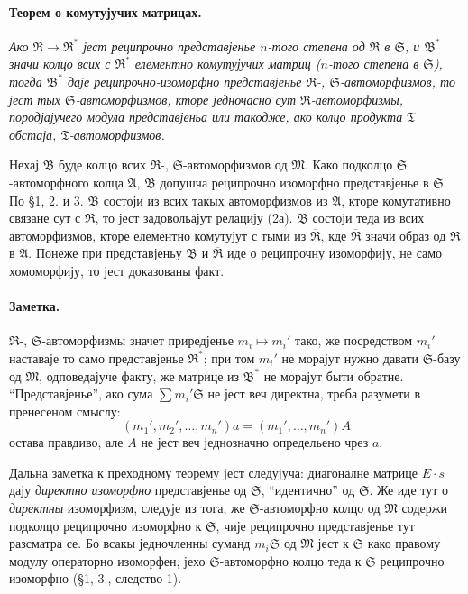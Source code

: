 ﻿\documentclass[11pt]{article}
\providecommand{\frB}{\mathfrak B}
\providecommand{\frM}{\mathfrak M}
\providecommand{\frR}{\mathfrak R}
\providecommand{\frS}{\mathfrak S}
\providecommand{\frT}{\mathfrak T}
\providecommand{\mA}{\mathfrak A}
\begin{document}
\paragraph{Теорем о комутујучих матрицах.}
\emph{Ако \(\frR\to\frR^*\) јест реципрочно представјенье \(n\)-того степена од \(\frR\) в \(\frS\), и \(\frB^*\) значи колцо всих с \(\frR^*\) елементно комутујучих матриц (\(n\)-того степена в \(\frS\)), тогда \(\frB^*\) даје реципрочно-изоморфно представјенье \(\frR\)-, \(\frS\)-автоморфизмов, то јест тых \(\frS\)-автоморфизмов, кторе једночасно сут \(\frR\)-автоморфизмы, породјајучего модула представјеньа или такодже, ако колцо продукта \(\frT\) обстаја, \(\frT\)-автоморфизмов.}

Нехај \(\frB\) буде колцо всих \(\frR\)-, \(\frS\)-автоморфизмов од \(\frM\). Како подколцо \(\frS\)-автоморфного колца \(\mA\), \(\frB\) допушча реципрочно изоморфно представјенье в \(\frS\). По §1, 2. и 3. \(\frB\) состоји из всих такых автоморфизмов из \(\mA\), кторе комутативно связане сут с \(\frR\), то јест задовольајут релацију (2а). \(\frB\) состоји теда из всих автоморфизмов, кторе елементно комутујут с тыми из \(\overline{\frR}\), кде \(\overline{\frR}\) значи образ од \(\frR\) в \(\mA\). Понеже при представјеньу \(\frB\) и \(\overline{\frR}\) иде о реципрочну изоморфију, не само хомоморфију, то јест доказованы факт.

\paragraph{Заметка.}
\(\frR\)-, \(\frS\)-автоморфизмы значет приредјенье \(m_i\mapsto m_i'\) тако, же посредством \(m_i'\) наставаје то само представјенье \(\frR^*\); при том \(m_i'\) не морајут нужно давати \(\frS\)-базу од \(\frM\), одповедајуче факту, же матрице из \(\frB^*\) не морајут быти обратне. ``Представјенье'', ако сума \(\sum m_i'\frS\) не јест веч директна, треба разумети в пренесеном смыслу:
\[
        (m_1',m_2',\ldots,m_n')a=(m_1',\ldots,m_n')A
\]
остава правдиво, але \(A\) не јест веч једнозначно определьено чрез \(a\).

Дальна заметка к преходному теорему јест следујуча: диагоналне матрице \(E\cdot s\) дају \emph{директно изоморфно} представјенье од \(\frS\), ``идентично'' од \(\frS\). Же иде тут о \emph{директны} изоморфизм, следује из тога, же \(\frS\)-автоморфно колцо од \(\frM\) содержи подколцо реципрочно изоморфно к \(\frS\), чије реципрочно представјенье тут разсматра се. Бо всакы једночленны суманд \(m_i\frS\) од \(\frM\) јест к \(\frS\) како правому модулу операторно изоморфен, јехо \(\frS\)-автоморфно колцо теда к \(\frS\) реципрочно изоморфно (§1, 3., следство 1).
\end{document}

